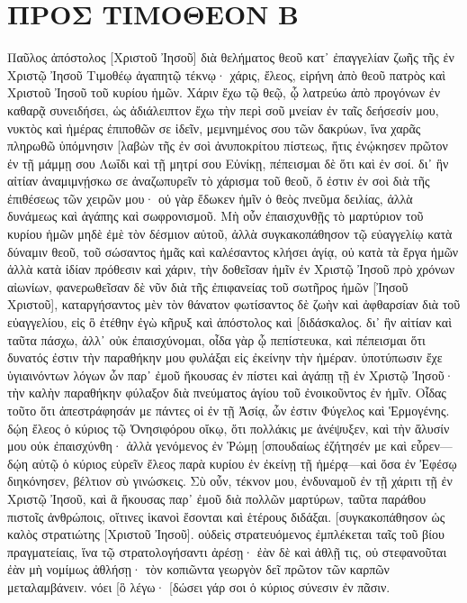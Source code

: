 \section{ΠΡΟΣ ΤΙΜΟΘΕΟΝ Β}
Παῦλος ἀπόστολος [Χριστοῦ Ἰησοῦ] διὰ θελήματος θεοῦ κατ᾽ ἐπαγγελίαν ζωῆς τῆς ἐν Χριστῷ Ἰησοῦ 
Τιμοθέῳ ἀγαπητῷ τέκνῳ· χάρις, ἔλεος, εἰρήνη ἀπὸ θεοῦ πατρὸς καὶ Χριστοῦ Ἰησοῦ τοῦ κυρίου ἡμῶν. 
Χάριν ἔχω τῷ θεῷ, ᾧ λατρεύω ἀπὸ προγόνων ἐν καθαρᾷ συνειδήσει, ὡς ἀδιάλειπτον ἔχω τὴν περὶ σοῦ μνείαν ἐν ταῖς δεήσεσίν μου, νυκτὸς καὶ ἡμέρας 
ἐπιποθῶν σε ἰδεῖν, μεμνημένος σου τῶν δακρύων, ἵνα χαρᾶς πληρωθῶ 
ὑπόμνησιν [λαβὼν τῆς ἐν σοὶ ἀνυποκρίτου πίστεως, ἥτις ἐνῴκησεν πρῶτον ἐν τῇ μάμμῃ σου Λωΐδι καὶ τῇ μητρί σου Εὐνίκῃ, πέπεισμαι δὲ ὅτι καὶ ἐν σοί. 
δι᾽ ἣν αἰτίαν ἀναμιμνῄσκω σε ἀναζωπυρεῖν τὸ χάρισμα τοῦ θεοῦ, ὅ ἐστιν ἐν σοὶ διὰ τῆς ἐπιθέσεως τῶν χειρῶν μου· 
οὐ γὰρ ἔδωκεν ἡμῖν ὁ θεὸς πνεῦμα δειλίας, ἀλλὰ δυνάμεως καὶ ἀγάπης καὶ σωφρονισμοῦ. 
Μὴ οὖν ἐπαισχυνθῇς τὸ μαρτύριον τοῦ κυρίου ἡμῶν μηδὲ ἐμὲ τὸν δέσμιον αὐτοῦ, ἀλλὰ συγκακοπάθησον τῷ εὐαγγελίῳ κατὰ δύναμιν θεοῦ, 
τοῦ σώσαντος ἡμᾶς καὶ καλέσαντος κλήσει ἁγίᾳ, οὐ κατὰ τὰ ἔργα ἡμῶν ἀλλὰ κατὰ ἰδίαν πρόθεσιν καὶ χάριν, τὴν δοθεῖσαν ἡμῖν ἐν Χριστῷ Ἰησοῦ πρὸ χρόνων αἰωνίων, 
φανερωθεῖσαν δὲ νῦν διὰ τῆς ἐπιφανείας τοῦ σωτῆρος ἡμῶν [Ἰησοῦ Χριστοῦ], καταργήσαντος μὲν τὸν θάνατον φωτίσαντος δὲ ζωὴν καὶ ἀφθαρσίαν διὰ τοῦ εὐαγγελίου, 
εἰς ὃ ἐτέθην ἐγὼ κῆρυξ καὶ ἀπόστολος καὶ [διδάσκαλος. 
δι᾽ ἣν αἰτίαν καὶ ταῦτα πάσχω, ἀλλ᾽ οὐκ ἐπαισχύνομαι, οἶδα γὰρ ᾧ πεπίστευκα, καὶ πέπεισμαι ὅτι δυνατός ἐστιν τὴν παραθήκην μου φυλάξαι εἰς ἐκείνην τὴν ἡμέραν. 
ὑποτύπωσιν ἔχε ὑγιαινόντων λόγων ὧν παρ᾽ ἐμοῦ ἤκουσας ἐν πίστει καὶ ἀγάπῃ τῇ ἐν Χριστῷ Ἰησοῦ· 
τὴν καλὴν παραθήκην φύλαξον διὰ πνεύματος ἁγίου τοῦ ἐνοικοῦντος ἐν ἡμῖν. 
Οἶδας τοῦτο ὅτι ἀπεστράφησάν με πάντες οἱ ἐν τῇ Ἀσίᾳ, ὧν ἐστιν Φύγελος καὶ Ἑρμογένης. 
δῴη ἔλεος ὁ κύριος τῷ Ὀνησιφόρου οἴκῳ, ὅτι πολλάκις με ἀνέψυξεν, καὶ τὴν ἅλυσίν μου οὐκ ἐπαισχύνθη· 
ἀλλὰ γενόμενος ἐν Ῥώμῃ [σπουδαίως ἐζήτησέν με καὶ εὗρεν— 
δῴη αὐτῷ ὁ κύριος εὑρεῖν ἔλεος παρὰ κυρίου ἐν ἐκείνῃ τῇ ἡμέρᾳ—καὶ ὅσα ἐν Ἐφέσῳ διηκόνησεν, βέλτιον σὺ γινώσκεις. 
Σὺ οὖν, τέκνον μου, ἐνδυναμοῦ ἐν τῇ χάριτι τῇ ἐν Χριστῷ Ἰησοῦ, 
καὶ ἃ ἤκουσας παρ᾽ ἐμοῦ διὰ πολλῶν μαρτύρων, ταῦτα παράθου πιστοῖς ἀνθρώποις, οἵτινες ἱκανοὶ ἔσονται καὶ ἑτέρους διδάξαι. 
[συγκακοπάθησον ὡς καλὸς στρατιώτης [Χριστοῦ Ἰησοῦ]. 
οὐδεὶς στρατευόμενος ἐμπλέκεται ταῖς τοῦ βίου πραγματείαις, ἵνα τῷ στρατολογήσαντι ἀρέσῃ· 
ἐὰν δὲ καὶ ἀθλῇ τις, οὐ στεφανοῦται ἐὰν μὴ νομίμως ἀθλήσῃ· 
τὸν κοπιῶντα γεωργὸν δεῖ πρῶτον τῶν καρπῶν μεταλαμβάνειν. 
νόει [ὃ λέγω· [δώσει γάρ σοι ὁ κύριος σύνεσιν ἐν πᾶσιν. 
